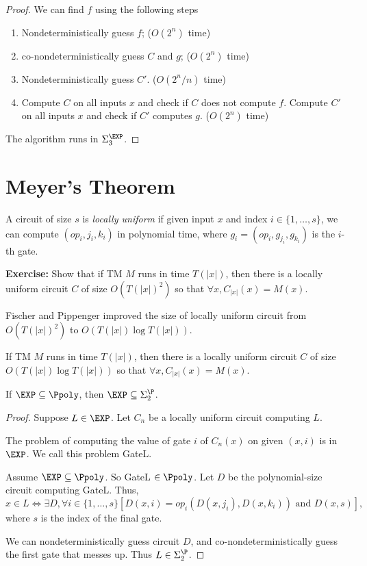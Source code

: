 \documentclass[letterpaper, 12pt]{article}
\begin{document}
\begin{proof}
	We can find $f$ using the following steps
	\begin{enumerate}
	\item Nondeterministically guess $f$; ($O(2^n)$ time)
	\item co-nondeterministically guess $C$ and $g$; ($O(2^n)$ time)
	\item Nondeterministically guess $C'$.  ($O(2^n/n)$ time)
	\item Compute $C$ on all inputs $x$ and check if $C$ does not compute $f$. Compute $C'$ on all inputs $x$ and check if $C'$ computes $g$. ($O(2^n)$ time)
	\end{enumerate}
	The algorithm runs in $\Sigma_3^\EXP$.
	
\end{proof}

\section{Meyer's Theorem}

\begin{definition}
	A circuit of size $s$ is \emph{locally uniform} if given input $x$ and index $i \in \{1, \dots, s\}$, we can compute $(op_i, j_i, k_i)$ in polynomial time, where $g_i = (op_i, g_{j_i}, g_{k_i})$ is the $i$-th gate.
\end{definition}

\noindent \textbf{Exercise:} Show that if TM $M$ runs in time $T(|x|)$, then there is a locally uniform circuit $C$ of size $O(T(|x|)^2)$ so that $\forall x, C_{|x|}(x) = M(x)$.

Fischer and Pippenger improved the size of locally uniform circuit from $O(T(|x|)^2)$ to $O(T(|x|) \log T(|x|))$.

\begin{theorem}
If TM $M$ runs in time $T(|x|)$, then there is a locally uniform circuit $C$ of size $O(T(|x|) \log T(|x|))$ so that $\forall x, C_{|x|}(x) = M(x)$.
\end{theorem}

\begin{theorem}[Meyer]
	If $\EXP \subseteq \Ppoly$, then $\EXP \subseteq \Sigma_2^\P$.
\end{theorem}

\begin{proof}
	Suppose $L \in \EXP$. Let $C_n$ be a locally uniform circuit computing $L$.
	
	The problem of computing the value of gate $i$ of $C_n(x)$ on given $(x,i)$ is in $\EXP$. We call this problem GateL.
	
	Assume $\EXP \subseteq \Ppoly$. So GateL $\in \Ppoly$. Let $D$ be the polynomial-size circuit computing GateL. Thus,
	\[x \in L \Leftrightarrow \exists D, \forall i \in \{1,\dots, s\} \left[ D(x,i) = op_i(D(x,j_i), D(x,k_i)) \mbox{ and } D(x,s)\right],\] where $s$ is the index of the final gate.
	
	We can nondeterministically guess circuit $D$, and co-nondeterministically guess the first gate that messes up. Thus $L \in \Sigma_2^\P$.
\end{proof}
\end{document}
